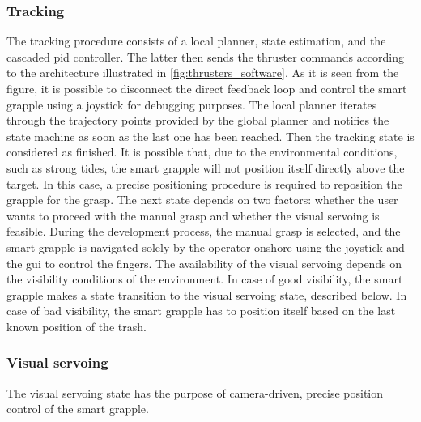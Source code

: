 \subsubsection{Tracking}
\label{sec:trackingState}
The tracking procedure consists of a local planner, state estimation, and the cascaded \gls{pid} controller. The latter then sends the thruster commands according to the architecture illustrated in  \ref{fig:thrusters_software}. As it is seen from the figure, it is possible to disconnect the direct feedback loop and control the smart grapple using a joystick for debugging purposes. The local planner iterates through the trajectory points provided by the global planner and notifies the state machine as soon as the last one has been reached. Then the tracking state is considered as finished. It is possible that, due to the environmental conditions, such as strong tides, the smart grapple will not position itself directly above the target. In this case, a precise positioning procedure is required to reposition the grapple for the grasp. The next state depends on two factors: whether the user wants to proceed with the manual grasp and whether the visual servoing is feasible. During the development process, the manual grasp is selected, and the smart grapple is navigated solely by the operator onshore using the joystick and the \gls{gui} to control the fingers. The availability of the visual servoing depends on the visibility conditions of the environment. In case of good visibility, the  smart grapple makes a state transition to the visual servoing state, described below. In case of bad visibility, the smart grapple has to position itself based on the last known position of the trash. 

\subsubsection{Visual servoing}
The visual servoing state has the purpose of camera-driven, precise position control of the smart grapple. 

